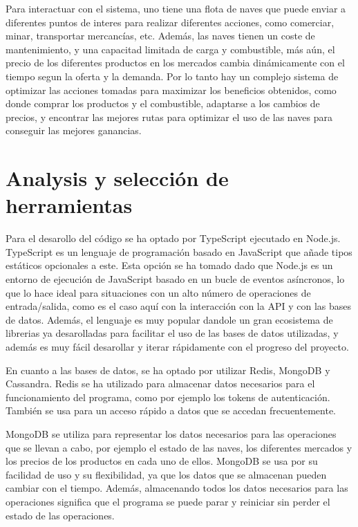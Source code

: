 \documentclass[spanish]{article}
\begin{document}
Para interactuar con el sistema, uno tiene una flota de naves
que puede enviar a diferentes puntos de interes para realizar
diferentes acciones, como comerciar, minar, transportar mercancías, etc.
Además, las naves tienen un coste de mantenimiento,
y una capacitad limitada de carga y combustible,
más aún, el precio de los diferentes productos en los mercados
cambia dinámicamente con el tiempo segun la oferta y la demanda.
Por lo tanto hay un complejo sistema de optimizar
las acciones tomadas para maximizar los beneficios obtenidos,
como donde comprar los productos y el combustible, adaptarse
a los cambios de precios, y encontrar las mejores rutas para
optimizar el uso de las naves para conseguir las mejores ganancias.

\section{Analysis y selección de herramientas}

Para el desarollo del código se ha optado por TypeScript ejecutado en Node.js.
TypeScript es un lenguaje de programación basado en JavaScript que añade tipos estáticos opcionales a este.
Esta opción se ha tomado dado que Node.js es un entorno de ejecución de JavaScript basado en un
bucle de eventos asíncronos, lo que lo hace ideal para situaciones con un alto número de operaciones de entrada/salida, como es el caso aquí
con la interacción con la API y con las bases de datos.
Además, el lenguaje es muy popular dandole un gran ecosistema de librerias ya desarolladas para facilitar el uso de las bases de datos utilizadas,
y además es muy fácil desarollar y iterar rápidamente con el progreso del proyecto.

En cuanto a las bases de datos, se ha optado por utilizar Redis, MongoDB y Cassandra.
Redis se ha utilizado para almacenar datos necesarios para el funcionamiento del programa, como por ejemplo los tokens de autenticación.
También se usa para un acceso rápido a datos que se accedan frecuentemente.

MongoDB se utiliza para representar los datos necesarios para las operaciones que se llevan a cabo, por ejemplo el estado de las naves,
los diferentes mercados y los precios de los productos en cada uno de ellos.
MongoDB se usa por su facilidad de uso y su flexibilidad, ya que los datos que se almacenan pueden cambiar con el tiempo.
Además, almacenando todos los datos necesarios para las operaciones significa que el programa
se puede parar y reiniciar sin perder el estado de las operaciones.
\end{document}
